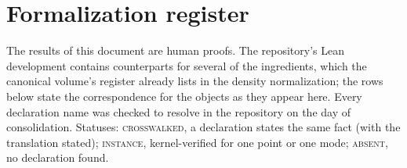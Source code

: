 \documentclass[11pt,oneside]{article}
\theoremstyle{plain}
\theoremstyle{definition}
\theoremstyle{remark}
\begin{document}
\section{Formalization register}
\label{rf:sec:register}

The results of this document are human proofs.  The repository's Lean
development \cite{proveit-primary} contains counterparts for several of the
ingredients, which the canonical volume's register \cite{proveit-due}
already lists in the density normalization; the rows below state the
correspondence for the objects as they appear here.  Every declaration
name was checked to resolve in the repository on the day of consolidation.
Statuses: \textsc{crosswalked}, a declaration states the same fact (with
the translation stated); \textsc{instance}, kernel-verified for one point
or one mode; \textsc{absent}, no declaration found.
\end{document}
